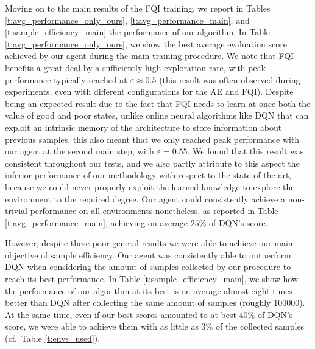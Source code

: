 Moving on to the main results of the FQI training, we report in Tables 
\ref{t:avg_performance_only_ours}, \ref{t:avg_performance_main}, and 
\ref{t:sample_efficiency_main} the performance of our algorithm.
In Table \ref{t:avg_performance_only_ours}, we show the best average evaluation 
score achieved by our agent during the main training procedure.
We note that FQI benefits a great deal by a sufficiently high exploration rate, 
with peak performance typically reached at $\varepsilon\approx0.5$ (this result was often
observed during experiments, even with different configurations for the AE and
FQI). 
Despite being an expected result due to the fact that FQI needs to learn at
once both the value of good and poor states, unlike online neural algorithms 
like DQN that can exploit an intrinsic memory of the architecture to store 
information about previous samples, this also meant that we only reached peak 
performance with our agent at the second main step, with $\varepsilon = 0.55$.
We found that this result was consistent throughout our tests, and we also 
partly attribute to this aspect the inferior performance of our methodology with
respect to the state of the art, because we could never properly exploit the 
learned knowledge to explore the environment to the required degree.
Our agent could consistently achieve a non-trivial performance on all
environments nonetheless, as reported in Table \ref{t:avg_performance_main}, 
achieving on average $25\%$ of DQN's score.

However, despite these poor general results we were able to achieve our main
objective of sample efficiency.
Our agent was consistently able to outperform DQN when considering the amount of
samples collected by our procedure to reach its best performance. 
In Table \ref{t:sample_efficiency_main}, we show how the performance of our 
algorithm at its best is on average almost eight times better than DQN after 
collecting the same amount of samples (roughly $100000$).
At the same time, even if our best scores amounted to at best $40\%$ of DQN's 
score, we were able to achieve them with as little as $3\%$ of the collected 
samples (cf.\ Table \ref{t:envs_used}).

